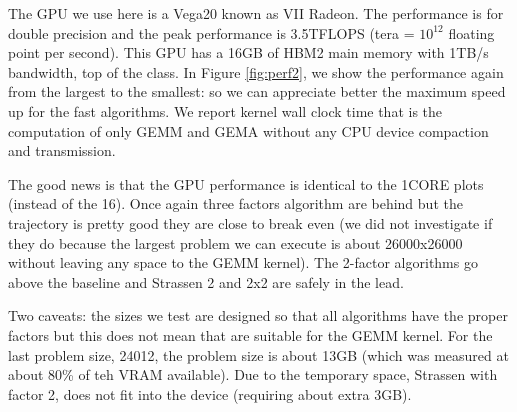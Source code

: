 \documentclass[acmsmall]{acmart}
\begin{document}


The GPU we use here is a Vega20 known as VII Radeon. The performance
is for double precision and the peak performance is 3.5TFLOPS (tera =
$10^{12}$ floating point per second). This GPU has a 16GB of HBM2 main
memory with 1TB/s bandwidth, top of the class.  In Figure
\ref{fig:perf2}, we show the performance again from the largest to the
smallest: so we can appreciate better the maximum speed up for the
fast algorithms. We report kernel wall clock time that is the
computation of only GEMM and GEMA without any CPU device compaction
and transmission.


The good news is that the GPU performance is identical to the 1CORE
plots (instead of the 16). Once again three factors algorithm are
behind but the trajectory is pretty good they are close to break even
(we did not investigate if they do because the largest problem we can
execute is about 26000x26000 without leaving any space to the GEMM
kernel). The 2-factor algorithms go above the baseline and Strassen 2
and 2x2 are safely in the lead.


Two caveats: the sizes we test are designed so that all algorithms have
the proper factors but this does not mean that are suitable for the
GEMM kernel. For the last problem size, 24012, the problem size is
about 13GB (which was measured at about 80\% of teh VRAM
available). Due to the temporary space, Strassen with factor 2, does
not fit into the device (requiring about extra 3GB).  


  







%

 

%
\end{document}
